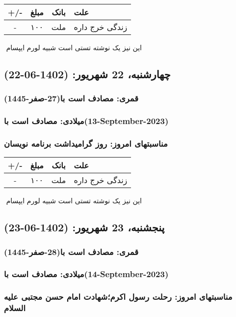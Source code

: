 \documentclass{article}
\newcommand{\rnote}[1]{\marginpar{\textcolor{color}{\StrSubstitute{\##1}{ }{\_}}}}
\newcommand{\myRow}[4]{
    #1 & #2 & #3 & #4 \\ \hline
}
\begin{document}
\begin{tabular}{ | c | c | c | p{5cm} |}
    \hline
    \myRow{ +/- }{مبلغ}{بانک}{علت}
    \myRow{-}{۱۰۰}{ملت}{زندگی خرج داره}
\end{tabular}
\newline
\newline

‌
\rnote{تست}
این نیز یک نوشته تستی است شبیه لورم ایپسام




\newpage
{}
\textcolor{color}{
\section{ چهارشنبه، 22 شهریور: (1402-06-22) }
\subsubsection*{قمری: مصادف است با(27-صفر-1445)} 
\subsubsection*{میلادی: مصادف است با(13-September-2023)}
\subsubsection*{مناسبتهای امروز: روز گرامیداشت برنامه نویسان}
}


\begin{tabular}{ | c | c | c | p{5cm} |}
    \hline
    \myRow{ +/- }{مبلغ}{بانک}{علت}
    \myRow{-}{۱۰۰}{ملت}{زندگی خرج داره}
\end{tabular}
\newline
\newline

‌
\rnote{تست}
این نیز یک نوشته تستی است شبیه لورم ایپسام




\newpage
{}
\textcolor{color}{
\section{ پنجشنبه، 23 شهریور: (1402-06-23) }
\subsubsection*{قمری: مصادف است با(28-صفر-1445)} 
\subsubsection*{میلادی: مصادف است با(14-September-2023)}
\subsubsection*{مناسبتهای امروز: رحلت رسول اکرم؛شهادت امام حسن مجتبی علیه السلام}
}
\end{document}
